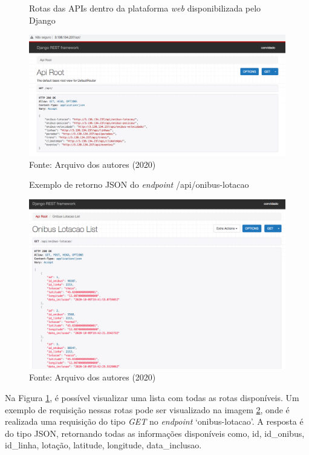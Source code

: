 \begin{figure}[H]
    \centering
    \caption{Rotas das APIs dentro da plataforma \textit{web} disponibilizada pelo Django}
    \includegraphics[width=1.0\linewidth]{Imagens/rotasDisponiveis.png}
    \caption*{Fonte: Arquivo dos autores (2020)}
    \label{rotasDisponiveis}
\end{figure}
\begin{figure}[H]
    \centering
    \caption{Exemplo de retorno JSON do \textit{endpoint} /api/onibus-lotacao}
    \includegraphics[width=1.0\linewidth]{Imagens/onibusLotacaoExemplo.png}
    \caption*{Fonte: Arquivo dos autores (2020)}
    \label{onibusLotacaoExemplo}
\end{figure}
\par Na Figura \ref{rotasDisponiveis}, é possível visualizar uma lista com todas as rotas disponíveis. Um exemplo de requisição nessas rotas pode ser visualizado na imagem \ref{onibusLotacaoExemplo}, onde é realizada uma requisição do tipo \textit{GET} no \textit{endpoint} ‘onibus-lotacao’. A resposta é do tipo JSON, retornando todas as informações disponíveis como, id, id\_onibus, id\_linha, lotação, latitude, longitude, data\_inclusao.


